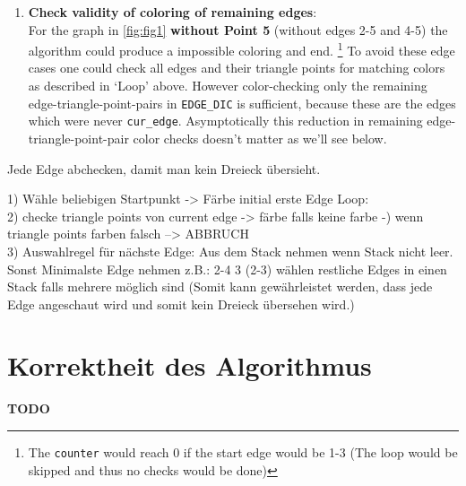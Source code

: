 \documentclass[english]{scrartcl}
\newcommand{\code}{\texttt}
\begin{document}
\begin{enumerate}
    \item \textbf{Check validity of coloring of remaining edges}:\\For the graph in \autoref{fig:fig1} \textbf{without Point 5} (without edges 2-5 and 4-5) the algorithm could produce a impossible coloring and end. \footnote{The \code{counter} would reach 0 if the start edge would be 1-3 (The loop would be skipped and thus no checks would be done)} To avoid these edge cases one could check all edges and their triangle points for matching colors as described in \enquote*{Loop} above. However color-checking only the remaining edge-triangle-point-pairs in \code{EDGE\_DIC} is sufficient, because these are the edges which were never \code{cur\_edge}. Asymptotically this reduction in remaining edge-triangle-point-pair color checks doesn't matter as we'll see below. 
\end{enumerate}

Jede Edge abchecken, damit man kein Dreieck übersieht. 

1) Wähle beliebigen Startpunkt -> Färbe initial erste Edge
Loop:\\
2) checke triangle points von current edge -> färbe falls keine farbe
    -) wenn triangle points farben falsch --> ABBRUCH\\
3) Auswahlregel für nächste Edge: Aus dem Stack nehmen wenn Stack nicht leer. Sonst Minimalste Edge nehmen z.B.: 2-4   3 (2-3) wählen restliche Edges in einen Stack falls mehrere möglich sind
(Somit kann gewährleistet werden, dass jede Edge angeschaut wird und somit kein Dreieck übersehen wird.)






\section{Korrektheit des Algorithmus}
\label{sec:correctness}
\textbf{TODO}




\clearpage


\end{document}
